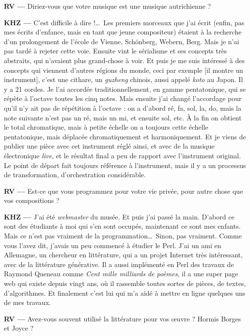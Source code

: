 \documentclass[a4paper,12pt]{article}
\begin{document}
\textbf{RV ---} Diriez-vous que votre musique est une musique autrichienne ?

\textbf{KHZ ---} C'est difficile à dire !\dots~Les premiers morceaux que j'ai écrit (enfin, pas mes écrits d'enfance, mais en tant que jeune compositeur) étaient à la recherche d'un prolongement de l'école de Vienne, Schönberg, Webern, Berg. Mais je n'ai pas tardé à rejeter cette voie. Ensuite vint le sérialisme et ses concepts très abstraits, qui n'avaient plus grand-chose à voir. Et puis je me suis intéressé à des concepts qui viennent d'autres régions du monde, ceci par exemple [il montre un instrument], c'est une cithare, un \emph{guzheng} chinois, aussi appelé \emph{koto} au Japon. Il y a 21 cordes. Je l'ai accordée traditionnellement, en gamme pentatonique, qui se répète à l'octave toutes les cinq notes. Mais ensuite j'ai changé l'accordage pour qu'il n'y ait pas de répétition à l'octave : on a d'abord ré, fa, sol, la, do, mais la note suivante n'est pas un ré, mais un mi, et ensuite sol, etc. À la fin on obtient le total chromatique, mais à petite échelle on a toujours cette échelle pentatonique, mais déplacée chromatiquement et harmoniquement. Et je viens de publier une pièce avec cet instrument réglé ainsi, et avec de la musique électronique \emph{live}, et le résultat final a peu de rapport avec l'instrument original. Le point de départ fait toujours référence à l'instrument, mais il y a un processus de transformation, d'orchestration considérable.

\textbf{RV ---} Est-ce que vous programmez pour votre vie privée, pour autre chose que vos compositions ?

\textbf{KHZ ---} J'ai été \emph{webmaster} du musée. Et puis j'ai passé la main. D'abord ce sont des étudiants à moi qui s'en sont occupés, maintenant ce sont mes enfants. Mais ce n'est pas vraiment de la programmation\dots~Sinon, pas vraiment. Comme vous l'avez dit, j'avais un peu commencé à étudier le Perl. J'ai un ami en Allemagne, un chercheur en littérature, qui a un projet Internet très intéressant, avec de la littérature générative. Il a aussi implémenté en Perl des travaux de Raymond Queneau comme \emph{Cent mille milliards de poèmes}, il a une super page web qui existe depuis vingt ans, où il rassemble toutes sortes de pièces, de textes, d'algorithmes. Et finalement c'est lui qui m'a aidé à mettre en ligne quelques uns de mes travaux.

\textbf{RV ---} Avez-vous souvent utilisé la littérature pour vos œuvre ? Hormis Borges et Joyce ?
\end{document}
